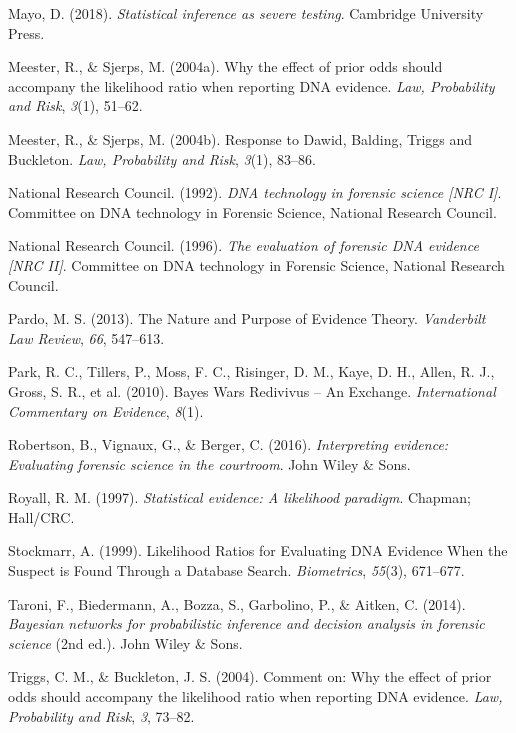 \documentclass[10pt,dvipsnames,enabledeprecatedfontcommands]{scrartcl}
\begin{document}
\hypertarget{ref-mayo2018}{}
Mayo, D. (2018). \emph{Statistical inference as severe testing}.
Cambridge University Press.

\hypertarget{ref-meester2004WhyEffectPriora}{}
Meester, R., \& Sjerps, M. (2004a). Why the effect of prior odds should
accompany the likelihood ratio when reporting DNA evidence. \emph{Law,
Probability and Risk}, \emph{3}(1), 51--62.

\hypertarget{ref-meester2004ResponseDawidBalding}{}
Meester, R., \& Sjerps, M. (2004b). Response to Dawid, Balding, Triggs
and Buckleton. \emph{Law, Probability and Risk}, \emph{3}(1), 83--86.

\hypertarget{ref-NRCI1992}{}
National Research Council. (1992). \emph{DNA technology in forensic
science \textup{{[}NRC I{]}}}. Committee on DNA technology in Forensic
Science, National Research Council.

\hypertarget{ref-NRCII1996}{}
National Research Council. (1996). \emph{The evaluation of forensic DNA
evidence \textup{{[}NRC II{]}}}. Committee on DNA technology in Forensic
Science, National Research Council.

\hypertarget{ref-pardo2013NaturePurposeEvidence}{}
Pardo, M. S. (2013). The Nature and Purpose of Evidence Theory.
\emph{Vanderbilt Law Review}, \emph{66}, 547--613.

\hypertarget{ref-park2010BayesWarsRedivivus}{}
Park, R. C., Tillers, P., Moss, F. C., Risinger, D. M., Kaye, D. H.,
Allen, R. J., Gross, S. R., et al. (2010). Bayes Wars Redivivus -- An
Exchange. \emph{International Commentary on Evidence}, \emph{8}(1).

\hypertarget{ref-robertson2016interpreting}{}
Robertson, B., Vignaux, G., \& Berger, C. (2016). \emph{Interpreting
evidence: Evaluating forensic science in the courtroom}. John Wiley \&
Sons.

\hypertarget{ref-Royall1997}{}
Royall, R. M. (1997). \emph{Statistical evidence: A likelihood
paradigm}. Chapman; Hall/CRC.

\hypertarget{ref-stockmarr1999LikelihoodRatiosEvaluating}{}
Stockmarr, A. (1999). Likelihood Ratios for Evaluating DNA Evidence When
the Suspect is Found Through a Database Search. \emph{Biometrics},
\emph{55}(3), 671--677.

\hypertarget{ref-taroni2006bayesian}{}
Taroni, F., Biedermann, A., Bozza, S., Garbolino, P., \& Aitken, C.
(2014). \emph{Bayesian networks for probabilistic inference and decision
analysis in forensic science} (2nd ed.). John Wiley \& Sons.

\hypertarget{ref-triggsCommentWhyEffecta}{}
Triggs, C. M., \& Buckleton, J. S. (2004). Comment on: Why the effect of
prior odds should accompany the likelihood ratio when reporting DNA
evidence. \emph{Law, Probability and Risk}, \emph{3}, 73--82.
\end{document}

